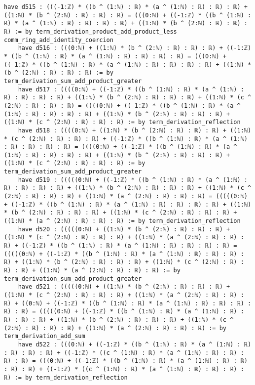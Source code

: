 \documentclass{article}
\begin{document}
\begin{tcolorbox}[colback=white!10, width=\linewidth]
\begin{lstlisting}[language=Lean4]
    have d515 : (((-1:ℤ) * ((b ^ (1:ℕ) : ℝ) * (a ^ (1:ℕ) : ℝ) : ℝ) : ℝ) + ((1:ℕ) * (b ^ (2:ℕ) : ℝ) : ℝ) : ℝ) = (((0:ℕ) + ((-1:ℤ) * ((b ^ (1:ℕ) : ℝ) * (a ^ (1:ℕ) : ℝ) : ℝ) : ℝ) : ℝ) + ((1:ℕ) * (b ^ (2:ℕ) : ℝ) : ℝ) : ℝ) := by term_derivation_product_add_product_less comm_ring_add_identity_coercion
    have d516 : (((0:ℕ) + ((1:ℕ) * (b ^ (2:ℕ) : ℝ) : ℝ) : ℝ) + ((-1:ℤ) * ((b ^ (1:ℕ) : ℝ) * (a ^ (1:ℕ) : ℝ) : ℝ) : ℝ) : ℝ) = (((0:ℕ) + ((-1:ℤ) * ((b ^ (1:ℕ) : ℝ) * (a ^ (1:ℕ) : ℝ) : ℝ) : ℝ) : ℝ) + ((1:ℕ) * (b ^ (2:ℕ) : ℝ) : ℝ) : ℝ) := by term_derivation_sum_add_product_greater
    have d517 : ((((0:ℕ) + ((-1:ℤ) * ((b ^ (1:ℕ) : ℝ) * (a ^ (1:ℕ) : ℝ) : ℝ) : ℝ) : ℝ) + ((1:ℕ) * (b ^ (2:ℕ) : ℝ) : ℝ) : ℝ) + ((1:ℕ) * (c ^ (2:ℕ) : ℝ) : ℝ) : ℝ) = ((((0:ℕ) + ((-1:ℤ) * ((b ^ (1:ℕ) : ℝ) * (a ^ (1:ℕ) : ℝ) : ℝ) : ℝ) : ℝ) + ((1:ℕ) * (b ^ (2:ℕ) : ℝ) : ℝ) : ℝ) + ((1:ℕ) * (c ^ (2:ℕ) : ℝ) : ℝ) : ℝ) := by term_derivation_reflection
    have d518 : ((((0:ℕ) + ((1:ℕ) * (b ^ (2:ℕ) : ℝ) : ℝ) : ℝ) + ((1:ℕ) * (c ^ (2:ℕ) : ℝ) : ℝ) : ℝ) + ((-1:ℤ) * ((b ^ (1:ℕ) : ℝ) * (a ^ (1:ℕ) : ℝ) : ℝ) : ℝ) : ℝ) = ((((0:ℕ) + ((-1:ℤ) * ((b ^ (1:ℕ) : ℝ) * (a ^ (1:ℕ) : ℝ) : ℝ) : ℝ) : ℝ) + ((1:ℕ) * (b ^ (2:ℕ) : ℝ) : ℝ) : ℝ) + ((1:ℕ) * (c ^ (2:ℕ) : ℝ) : ℝ) : ℝ) := by term_derivation_sum_add_product_greater
    have d519 : (((((0:ℕ) + ((-1:ℤ) * ((b ^ (1:ℕ) : ℝ) * (a ^ (1:ℕ) : ℝ) : ℝ) : ℝ) : ℝ) + ((1:ℕ) * (b ^ (2:ℕ) : ℝ) : ℝ) : ℝ) + ((1:ℕ) * (c ^ (2:ℕ) : ℝ) : ℝ) : ℝ) + ((1:ℕ) * (a ^ (2:ℕ) : ℝ) : ℝ) : ℝ) = (((((0:ℕ) + ((-1:ℤ) * ((b ^ (1:ℕ) : ℝ) * (a ^ (1:ℕ) : ℝ) : ℝ) : ℝ) : ℝ) + ((1:ℕ) * (b ^ (2:ℕ) : ℝ) : ℝ) : ℝ) + ((1:ℕ) * (c ^ (2:ℕ) : ℝ) : ℝ) : ℝ) + ((1:ℕ) * (a ^ (2:ℕ) : ℝ) : ℝ) : ℝ) := by term_derivation_reflection
    have d520 : (((((0:ℕ) + ((1:ℕ) * (b ^ (2:ℕ) : ℝ) : ℝ) : ℝ) + ((1:ℕ) * (c ^ (2:ℕ) : ℝ) : ℝ) : ℝ) + ((1:ℕ) * (a ^ (2:ℕ) : ℝ) : ℝ) : ℝ) + ((-1:ℤ) * ((b ^ (1:ℕ) : ℝ) * (a ^ (1:ℕ) : ℝ) : ℝ) : ℝ) : ℝ) = (((((0:ℕ) + ((-1:ℤ) * ((b ^ (1:ℕ) : ℝ) * (a ^ (1:ℕ) : ℝ) : ℝ) : ℝ) : ℝ) + ((1:ℕ) * (b ^ (2:ℕ) : ℝ) : ℝ) : ℝ) + ((1:ℕ) * (c ^ (2:ℕ) : ℝ) : ℝ) : ℝ) + ((1:ℕ) * (a ^ (2:ℕ) : ℝ) : ℝ) : ℝ) := by term_derivation_sum_add_product_greater
    have d521 : (((((0:ℕ) + ((1:ℕ) * (b ^ (2:ℕ) : ℝ) : ℝ) : ℝ) + ((1:ℕ) * (c ^ (2:ℕ) : ℝ) : ℝ) : ℝ) + ((1:ℕ) * (a ^ (2:ℕ) : ℝ) : ℝ) : ℝ) + ((0:ℕ) + ((-1:ℤ) * ((b ^ (1:ℕ) : ℝ) * (a ^ (1:ℕ) : ℝ) : ℝ) : ℝ) : ℝ) : ℝ) = (((((0:ℕ) + ((-1:ℤ) * ((b ^ (1:ℕ) : ℝ) * (a ^ (1:ℕ) : ℝ) : ℝ) : ℝ) : ℝ) + ((1:ℕ) * (b ^ (2:ℕ) : ℝ) : ℝ) : ℝ) + ((1:ℕ) * (c ^ (2:ℕ) : ℝ) : ℝ) : ℝ) + ((1:ℕ) * (a ^ (2:ℕ) : ℝ) : ℝ) : ℝ) := by term_derivation_add_sum
    have d522 : (((0:ℕ) + ((-1:ℤ) * ((b ^ (1:ℕ) : ℝ) * (a ^ (1:ℕ) : ℝ) : ℝ) : ℝ) : ℝ) + ((-1:ℤ) * ((c ^ (1:ℕ) : ℝ) * (a ^ (1:ℕ) : ℝ) : ℝ) : ℝ) : ℝ) = (((0:ℕ) + ((-1:ℤ) * ((b ^ (1:ℕ) : ℝ) * (a ^ (1:ℕ) : ℝ) : ℝ) : ℝ) : ℝ) + ((-1:ℤ) * ((c ^ (1:ℕ) : ℝ) * (a ^ (1:ℕ) : ℝ) : ℝ) : ℝ) : ℝ) := by term_derivation_reflection

\end{lstlisting}
\end{tcolorbox}
\end{document}
